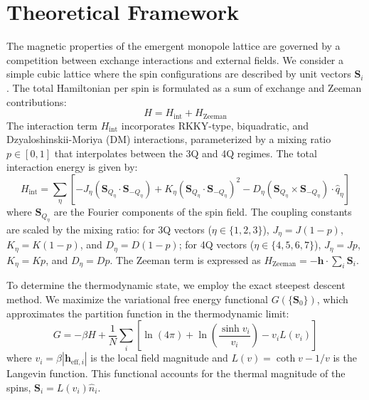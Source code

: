 \section{Theoretical Framework}
\label{sec:theory}

The magnetic properties of the emergent monopole lattice are governed by a competition between exchange interactions and external fields. We consider a simple cubic lattice where the spin configurations are described by unit vectors $\mathbf{S}_i$. The total Hamiltonian per spin is formulated as a sum of exchange and Zeeman contributions:
\begin{equation}
    H = H_{\text{int}} + H_{\text{Zeeman}}
\end{equation}
The interaction term $H_{\text{int}}$ incorporates RKKY-type, biquadratic, and Dzyaloshinskii-Moriya (DM) interactions, parameterized by a mixing ratio $p \in [0, 1]$ that interpolates between the 3Q and 4Q regimes. The total interaction energy is given by:
\begin{equation}
    H_{\text{int}} = \sum_{\eta} \left[ -J_\eta (\mathbf{S}_{Q_\eta} \cdot \mathbf{S}_{-Q_\eta}) + K_\eta (\mathbf{S}_{Q_\eta} \cdot \mathbf{S}_{-Q_\eta})^2 - D_\eta (\mathbf{S}_{Q_\eta} \times \mathbf{S}_{-Q_\eta}) \cdot \hat{q}_\eta \right]
\end{equation}
where $\mathbf{S}_{Q_\eta}$ are the Fourier components of the spin field. The coupling constants are scaled by the mixing ratio: for 3Q vectors ($\eta \in \{1, 2, 3\}$), $J_\eta = J(1-p)$, $K_\eta = K(1-p)$, and $D_\eta = D(1-p)$; for 4Q vectors ($\eta \in \{4, 5, 6, 7\}$), $J_\eta = Jp$, $K_\eta = Kp$, and $D_\eta = Dp$. The Zeeman term is expressed as $H_{\text{Zeeman}} = -\mathbf{h} \cdot \sum_i \mathbf{S}_i$.

To determine the thermodynamic state, we employ the exact steepest descent method. We maximize the variational free energy functional $G(\{\mathbf{S}_0\})$, which approximates the partition function in the thermodynamic limit:
\begin{equation}
    G = -\beta H + \frac{1}{N} \sum_i \left[ \ln(4\pi) + \ln\left(\frac{\sinh v_i}{v_i}\right) - v_i L(v_i) \right]
\end{equation}
where $v_i = \beta | \mathbf{h}_{\text{eff}, i} |$ is the local field magnitude and $L(v) = \coth v - 1/v$ is the Langevin function. This functional accounts for the thermal magnitude of the spins, $\mathbf{S}_i = L(v_i) \hat{n}_i$.

